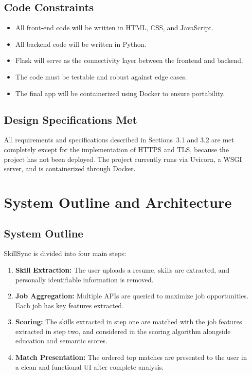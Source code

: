 \documentclass[12pt]{article}
\begin{document}
\subsection{Code Constraints}

\begin{itemize}
    \item All front-end code will be written in HTML, CSS, and JavaScript.
    \item All backend code will be written in Python.
    \item Flask will serve as the connectivity layer between the frontend and backend.
    \item The code must be testable and robust against edge cases.
    \item The final app will be containerized using Docker to ensure portability.
\end{itemize}

\subsection{Design Specifications Met}

All requirements and specifications described in Sections~3.1 and 3.2 are met completely except for the implementation of HTTPS and TLS, because the project has not been deployed.
The project currently runs via Uvicorn, a WSGI server, and is containerized through Docker.

\section{System Outline and Architecture}

\subsection{System Outline}

SkillSync is divided into four main steps:

\begin{enumerate}
    \item \textbf{Skill Extraction:} The user uploads a resume, skills are extracted, and personally identifiable information is removed.
    \item \textbf{Job Aggregation:} Multiple APIs are queried to maximize job opportunities. Each job has key features extracted.
    \item \textbf{Scoring:} The skills extracted in step one are matched with the job features extracted in step two, and considered in the scoring algorithm alongside education and semantic scores.
    \item \textbf{Match Presentation:} The ordered top matches are presented to the user in a clean and functional UI after complete analysis.
\end{enumerate}
\end{document}
